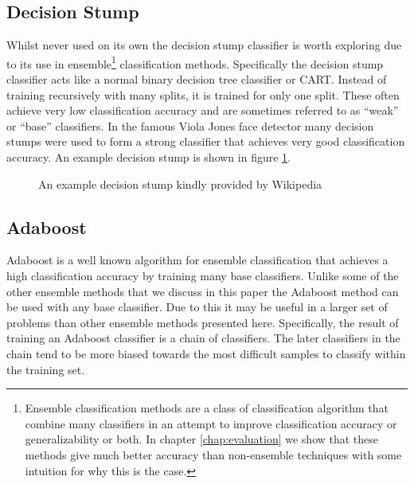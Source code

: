 \documentclass[ %
                    author={Sam Phippen},
                supervisor={Dr. Rafal Bogacz},
                     title={Real time voice activity detectors in noisy personal computing environments},
                  subtitle={},
                    degree={MEng},
                      year={2012} ]{thesis}
\begin{document}
\subsection{Decision Stump}

Whilst never used on its own the decision stump classifier is worth exploring
due to its use in ensemble\footnote{Ensemble classification methods are a class
    of classification algorithm that combine many classifiers in an attempt to
    improve classification accuracy or generalizability or both. In chapter
\ref{chap:evaluation} we show that these methods give much better accuracy than
non-ensemble techniques with some intuition for why this is the case.}
classification methods. Specifically the decision stump classifier acts like a
normal binary decision tree classifier or CART. Instead of training recursively
with many splits, it is trained for only one split. These often achieve very
low classification accuracy and are sometimes referred to as ``weak'' or ``base''
classifiers. In the famous Viola Jones face detector\cite{viola} many decision
stumps were used to form a strong classifier that achieves very good
classification accuracy. An example decision stump is shown in figure
\ref{fig:decision-stump}.

\begin{figure}



    \caption{An example decision stump kindly provided by Wikipedia}
    \label{fig:decision-stump}
\end{figure}

\subsection{Adaboost}

Adaboost is a well known\cite{viola}\cite{sun2006reducing} 
algorithm for ensemble classification that achieves a
high classification accuracy by training many base classifiers. Unlike some of
the other ensemble methods that we discuss in this paper the Adaboost method
can be used with any base classifier. Due to this it may be useful in a larger
set of problems than other ensemble methods presented here. Specifically, the
result of training an Adaboost classifier is a chain of classifiers. The later
classifiers in the chain tend to be more biased towards the most difficult
samples to classify within the training set.
\end{document}

